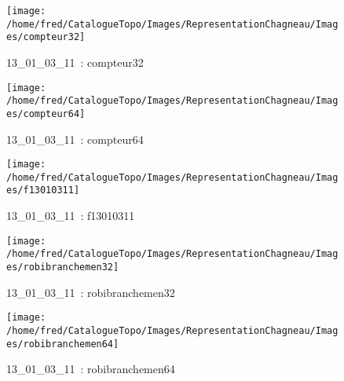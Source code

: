 \documentclass[12pt,titlepage]{book}
\begin{document}
\begin{figure}[h!]
\begin{minipage}[t]{3cm}
  \end{minipage}
  \begin{minipage}[t]{3cm}
    \begin{center}
      \texttt{[image: /home/fred/CatalogueTopo/Images/RepresentationChagneau/Images/compteur32]}
      \caption[~13\_01\_03\_11]{\small{13\_01\_03\_11~:} \tiny{compteur32}}\label{compteur32}
    \end{center}
  \end{minipage}
  \begin{minipage}[t]{3cm}
    \begin{center}
      \texttt{[image: /home/fred/CatalogueTopo/Images/RepresentationChagneau/Images/compteur64]}
      \caption[~13\_01\_03\_11]{\small{13\_01\_03\_11~:} \tiny{compteur64}}\label{compteur64}
    \end{center}
  \end{minipage}
  \begin{minipage}[t]{3cm}
    \begin{center}
      \texttt{[image: /home/fred/CatalogueTopo/Images/RepresentationChagneau/Images/f13010311]}
      \caption[~13\_01\_03\_11]{\small{13\_01\_03\_11~:} \tiny{f13010311}}\label{f13010311}
    \end{center}
  \end{minipage}
  \begin{minipage}[t]{3cm}
    \begin{center}
      \texttt{[image: /home/fred/CatalogueTopo/Images/RepresentationChagneau/Images/robibranchemen32]}
      \caption[~13\_01\_03\_11]{\small{13\_01\_03\_11~:} \tiny{robibranchemen32}}\label{robibranchemen32}
    \end{center}
  \end{minipage}
  \begin{minipage}[t]{3cm}
    \begin{center}
      \texttt{[image: /home/fred/CatalogueTopo/Images/RepresentationChagneau/Images/robibranchemen64]}
      \caption[~13\_01\_03\_11]{\small{13\_01\_03\_11~:} \tiny{robibranchemen64}}\label{robibranchemen64}
    \end{center}
  \end{minipage}
  \begin{minipage}[t]{3cm}
    \begin{center}

\end{center}
\end{minipage}
\end{figure}
\end{document}
